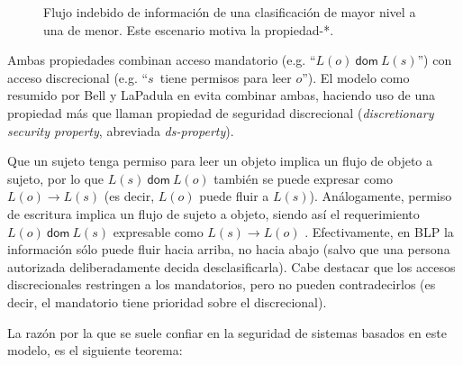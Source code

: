 \documentclass[main.tex]{subfiles}
\begin{document}
\begin{figure}[htp]
  \centering
  \begin{minipage}{.7\textwidth}
  \centering
  \caption{Flujo indebido de información de una clasificación de
  mayor nivel a una de menor. Este escenario motiva la propiedad-*.\label{fig:star} }
  \end{minipage}
\end{figure}
\hyphenchar{} %
    
Ambas propiedades combinan acceso mandatorio
(e.g. ``$L(o)~\mathsf{dom}~L(s)$'')
con acceso discrecional (e.g. ``$s$~tiene permisos para leer $o$'').
El modelo como resumido por Bell y LaPadula en \cite{BLP76} evita combinar
ambas, haciendo uso de una propiedad más que llaman propiedad de seguridad
discrecional (\textit{discretionary security property}, abreviada
\textit{ds-property}).

Que un sujeto tenga permiso para leer un objeto implica un flujo de
objeto a sujeto, por lo que $L(s)~\mathsf{dom}~L(o)$ también se puede expresar
como $L(o)\to L(s)$ (es decir, $L(o)$ puede fluir a $L(s)$). Análogamente,
permiso de escritura implica un flujo de sujeto a objeto, siendo así el
requerimiento $L(o)~\mathsf{dom}~L(s)$ expresable como $L(s)\to
L(o)$ \cite{Sandhu93}.
Efectivamente, en BLP la información sólo puede fluir hacia arriba, no hacia abajo (salvo que una persona autorizada deliberadamente decida desclasificarla). Cabe destacar que los accesos discrecionales restringen a los mandatorios, pero
no pueden contradecirlos (es decir, el mandatorio tiene prioridad sobre el
discrecional).

La razón por la que se suele confiar en la seguridad de sistemas basados en
este modelo, es el siguiente teorema:
\end{document}
